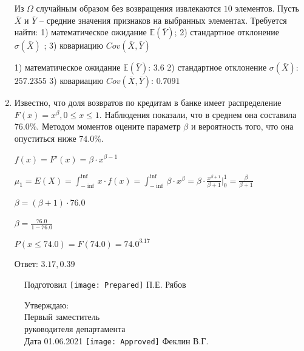 \documentclass[a4paper,14pt]{article}
\begin{document}
\begin{enumerate}
Из $\Omega$ случайным образом без возвращения извлекаются $10$ элементов. 
Пусть $\bar X$ и $\bar Y$ – средние значения признаков на выбранных элементах. 
Требуется найти: 1) математическое ожидание $\mathbb{E}(\bar Y)$; 2) стандартное отклонение $\sigma(\bar X)$ ; 
3) ковариацию $Cov(\bar X, \bar Y)$




1) математическое ожидание $\mathbb{E}(\bar Y)$: $3.6$ 
2) стандартное отклонение $\sigma(\bar X)$: $257.2355$
3) ковариацию $Cov(\bar X, \bar Y)$: $0.7091$


\item

    
	Известно, что доля возвратов по кредитам в банке имеет распределение $F(x) = x^{\beta}, 0 \le x \le 1$. Наблюдения показали, что в среднем она составила $76.0$\%. Методом моментов оцените параметр $\beta$ и вероятность того, что она опуститься ниже $74.0$\%.
	


	

	$f(x) = F'(x) = \beta \cdot x^{\beta - 1}$

	$\mu_{1} = E(X) = \int_{-\inf}^{\inf}x \cdot f(x) = \int_{-\inf}^{\inf} \beta \cdot x^{\beta} = \beta \cdot \frac{x^{\beta + 1}}{\beta + 1}\bigg|_0^1 = \frac{\beta}{\beta + 1}$

	$\beta = (\beta + 1) \cdot 76.0$

	$\beta = \frac{76.0}{1 - 76.0}$

	$ P(x \le 74.0) = F(74.0) = 74.0^{3.17} $

    Ответ: $3.17, 0.39$
	

\end{enumerate}

\begin{figure}[H]
	Подготовил
	\hfill
	\texttt{[image: Prepared]}
	П.Е. Рябов
\end{figure}


\begin{figure}[H]
	Утверждаю:\\
	Первый заместитель\\
	руководителя департамента\\
	Дата 01.06.2021
	\hfill
	\texttt{[image: Approved]}
	Феклин В.Г.
\end{figure}
\end{document}
